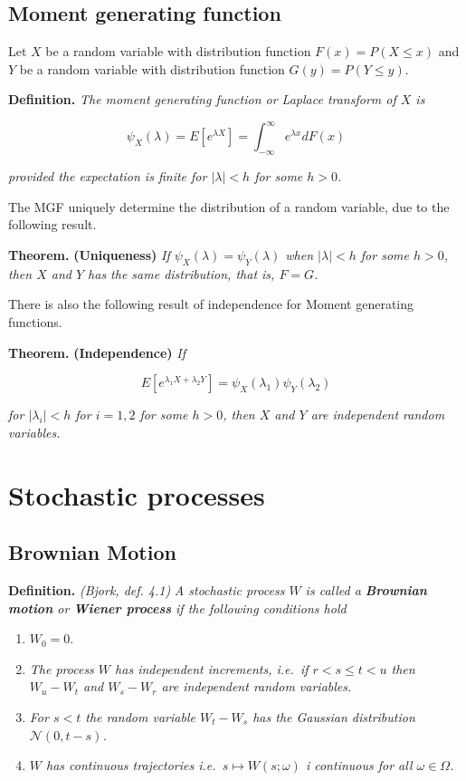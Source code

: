 \documentclass[
]{article}
\providecommand{\tightlist}{%
  \setlength{\itemsep}{0pt}\setlength{\parskip}{0pt}}
\begin{document}
\hypertarget{moment-generating-function}{%
\subsection{Moment generating
function}\label{moment-generating-function}}

Let \(X\) be a random variable with distribution function
\(F(x)=P(X\le x)\) and \(Y\) be a random variable with distribution
function \(G(y)=P(Y\le y)\).

\textbf{Definition.} \emph{The moment generating function or Laplace
transform of \(X\) is}

\[\psi_X(\lambda)=E\left[e^{\lambda X}\right]=\int_{-\infty}^\infty e^{\lambda x}dF(x)\]

\emph{provided the expectation is finite for \(\vert\lambda\vert<h\) for
some \(h>0\).}

The MGF uniquely determine the distribution of a random variable, due to
the following result.

\textbf{Theorem.} \textbf{(Uniqueness)} \emph{If
\(\psi_X(\lambda)=\psi_Y(\lambda)\) when \(\vert\lambda\vert<h\) for
some \(h>0\), then \(X\) and \(Y\) has the same distribution, that is,
\(F=G\).}

There is also the following result of independence for Moment generating
functions.

\textbf{Theorem.} \textbf{(Independence)} \emph{If}

\[E\left[e^{\lambda_1X+\lambda_2Y}\right]=\psi_X(\lambda_1)\psi_Y(\lambda_2)\]

\emph{for \(\vert\lambda_i\vert<h\) for \(i=1,2\) for some \(h>0\), then
\(X\) and \(Y\) are independent random variables.}

\hypertarget{stochastic-processes}{%
\section{Stochastic processes}\label{stochastic-processes}}

\hypertarget{brownian-motion}{%
\subsection{Brownian Motion}\label{brownian-motion}}

\textbf{Definition.} \emph{(Bjork, def. 4.1)} \emph{A stochastic process
\(W\) is called a \textbf{Brownian motion} or \textbf{Wiener process} if
the following conditions hold}

\begin{enumerate}
\def\labelenumi{\arabic{enumi}.}
\tightlist
\item
  \(W_0=0\).
\item
  \emph{The process \(W\) has independent increments, i.e.~if
  \(r<s\le t< u\) then \(W_u-W_t\) and \(W_s-W_r\) are independent
  random variables.}
\item
  \emph{For \(s<t\) the random variable \(W_t-W_s\) has the Gaussian
  distribution \(\mathcal{N}(0,t-s)\).}
\item
  \emph{\(W\) has continuous trajectories i.e.~\(s\mapsto W(s;\omega)\)
  i continuous for all \(\omega \in\Omega\).}
\end{enumerate}
\end{document}
